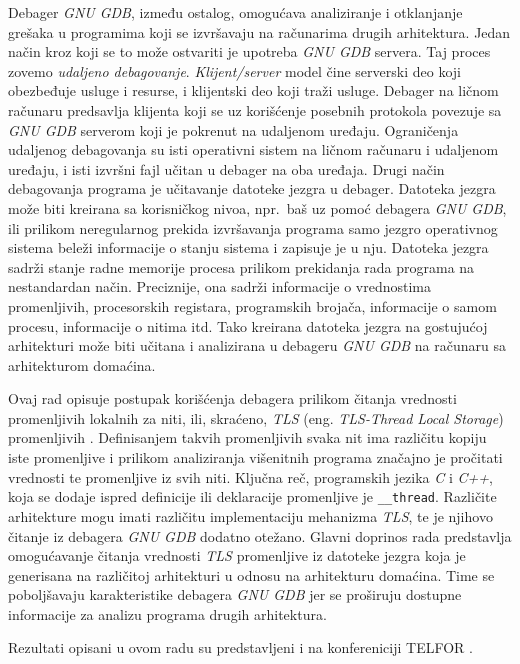 \documentclass[12pt,oneside]{memoir}
\begin{document}
Debager \emph{GNU GDB}, između ostalog, omogućava analiziranje i otklanjanje grešaka u programima koji se izvršavaju na računarima drugih arhitektura. Jedan način kroz koji se to može ostvariti je upotreba \emph{GNU GDB} servera. Taj proces zovemo \emph{udaljeno debagovanje}. \emph{Klijent/server} model čine serverski deo koji obezbeđuje usluge i resurse, i klijentski deo koji traži usluge. Debager na ličnom računaru predsavlja klijenta koji se uz korišćenje posebnih protokola povezuje sa \emph{GNU GDB} serverom koji je pokrenut na udaljenom uređaju. Ograničenja udaljenog debagovanja su isti operativni sistem na ličnom računaru i udaljenom uređaju, i isti izvršni fajl učitan u debager na oba uređaja. Drugi način debagovanja programa je učitavanje datoteke jezgra u debager. Datoteka jezgra može biti kreirana sa korisničkog nivoa, npr.~baš uz pomoć debagera \emph{GNU GDB}, ili prilikom neregularnog prekida izvršavanja programa samo jezgro operativnog sistema beleži informacije o stanju sistema i zapisuje je u nju. Datoteka jezgra sadrži stanje radne memorije procesa prilikom prekidanja rada programa na nestandardan način. Preciznije, ona sadrži informacije o vrednostima promenljivih, procesorskih registara, programskih brojača, informacije o samom procesu, informacije o nitima itd. Tako kreirana datoteka jezgra na gostujućoj arhitekturi može biti učitana i analizirana u debageru \emph{GNU GDB} na računaru sa arhitekturom domaćina.

Ovaj rad opisuje postupak korišćenja debagera prilikom čitanja vrednosti promenljivih lokalnih za niti, ili, skraćeno, \emph{TLS} (eng. \emph{TLS-Thread Local Storage}) promenljivih \cite{TLS}. Definisanjem takvih promenljivih svaka nit ima različitu kopiju iste promenljive i prilikom analiziranja višenitnih programa značajno je pročitati vrednosti te promenljive iz svih niti. Ključna reč, programskih jezika \emph{C} i \emph{C++}, koja se dodaje ispred definicije ili deklaracije promenljive je \texttt{\_\_thread}. Različite arhitekture mogu imati različitu implementaciju mehanizma \emph{TLS}, te je njihovo čitanje iz debagera \emph{GNU GDB} dodatno otežano.
Glavni doprinos rada predstavlja omogućavanje čitanja vrednosti \emph{TLS} promenljive iz datoteke jezgra koja je generisana na različitoj arhitekturi u odnosu na arhitekturu domaćina. Time se poboljšavaju karakteristike debagera \emph{GNU GDB} jer se proširuju dostupne informacije za analizu programa drugih arhitektura.

Rezultati opisani u ovom radu su predstavljeni i na konfereniciji TELFOR \cite{TELFOR}.
\end{document}

